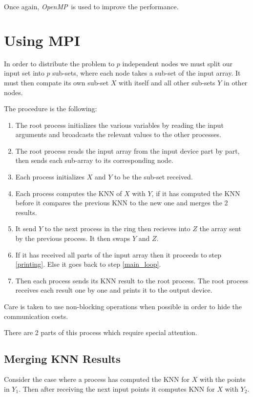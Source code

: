 \documentclass[10pt, a4paper]{article}
\newcommand{\omp}{\textit{OpenMP}}
\begin{document}
Once again, \omp \ is used to improve the performance.

\section{Using MPI}
In order to distribute the problem to $p$ independent nodes we must split our input set into
$p$ sub-sets, where each node takes a sub-set of the input array. It must then compate its own 
sub-set $X$ with itself and all other sub-sets $Y$ in other nodes.

The procedure is the following:
\begin{enumerate}
	\item The root process initializes the various variables by reading the input arguments
		and broadcasts the relevant values to the other processes.
	\item The root process reads the input array from the input device part by part, then sends each
		sub-array to its corresponding node.
	\item Each process initializes $X$ and $Y$ to be the sub-set received.
	\item Each process computes the KNN of $X$ with $Y$, if it has computed the KNN before it
		compares the previous KNN to the new one and merges the 2 results. \label{main_loop}
	\item It send $Y$ to the next process in the ring then recieves into $Z$ the array sent by 
		the previous process.  It then swaps $Y$ and $Z$.
	\item If it has received all parts of the input array then it proceeds to step \ref{printing}. Else it 
		goes back to step \ref{main_loop}.
	\item Then each process sends its KNN result to the root process. The root process receives each result 
		one by one and prints it to the output device. \label{printing}
\end{enumerate}

Care is taken to use non-blocking operations when possible in order to hide the communication costs.

There are 2 parts of this process which require special attention.

\subsection{Merging KNN Results}
Consider the case where a process has computed the KNN for $X$ with the points in $Y_1$.
Then after receiving the next input points it computes KNN for $X$ with $Y_2$.
\end{document}
